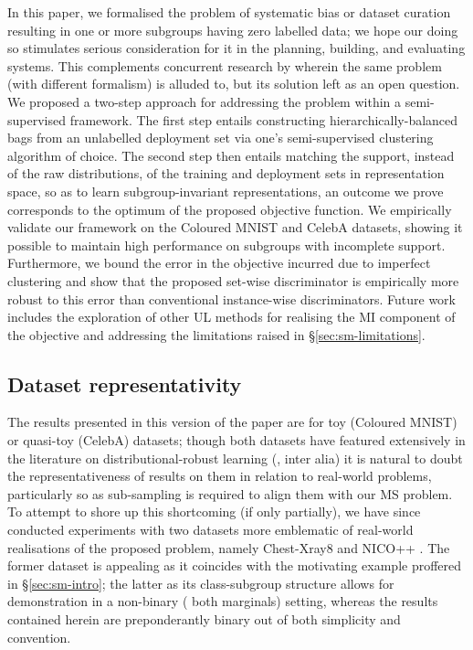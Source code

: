 %
In this paper, we formalised the problem of systematic bias or dataset curation resulting in one or
more subgroups having zero labelled data; we hope our doing so stimulates serious consideration for
it in the planning, building, and evaluating systems.
%
This complements concurrent research by \citet{yang2023change} wherein the same problem (with
different formalism) is alluded to, but its solution left as an open question.
%
We proposed a two-step approach for addressing the problem within a semi-supervised framework. 
%
The first step entails constructing hierarchically-balanced bags from an unlabelled deployment set
via one's semi-supervised clustering algorithm of choice.
%
The second step then entails matching the support, instead of the raw distributions, of the
training and deployment sets in representation space, so as to learn subgroup-invariant
representations, an outcome we prove corresponds to the optimum of the proposed objective function.
%
We empirically validate our frame\-work on the Coloured MNIST and CelebA datasets, showing it
possible to maintain high performance on subgroups with incomplete support.
%
Furthermore, we bound the error in the objective incurred due to imperfect clustering and show that
the proposed set-wise discriminator is empirically more robust to this error than conventional
instance-wise discriminators.
%
Future work includes the exploration of other \ac{UL} methods for realising the \ac{MI} component
of the objective and addressing the limitations raised in \S\ref{sec:sm-limitations}.

\subsection{Dataset representativity}
%
The results presented in this version of the paper are for toy (Coloured MNIST) or quasi-toy
(CelebA) datasets; though both datasets have featured extensively in the literature on
distributional-robust learning (\citealp{arjovsky2019invariant, kim2019learning,
sagawa2019distributionally, creager2021environment}, inter alia) it is natural to doubt the
representativeness of results on them in relation to real-world problems, particularly so as
sub-sampling is required to align them with our \ac{MS} problem.
%
%
To attempt to shore up this shortcoming (if only partially), we have since conducted experiments
with two datasets more emblematic of real-world realisations of the proposed problem, namely
Chest-Xray8 \citep{wang2017chestx} and NICO++ \citep{zhang2023nicopp}.
%
The former dataset is appealing as it coincides with the motivating example proffered in
\S\ref{sec:sm-intro}; the latter as its class-subgroup structure allows for demonstration in a
non-binary (\wrt{} both marginals) setting, whereas the results contained herein are preponderantly
binary out of both simplicity and convention.
%

